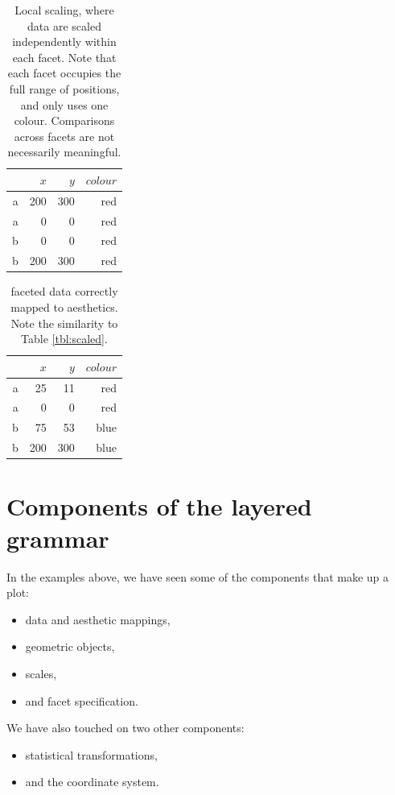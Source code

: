 \begin{table}[ht]
  \centering
  \begin{tabular}{r|r|r|r}
    & $x$ & $y$ & $colour$\\
    \hline
    a & 200 & 300 & red\\
    a & 0 & 0 & red\\
    \hline \hline
    b & 0 & 0 & red\\
    b & 200 & 300 & red
  \end{tabular}

  \caption{Local scaling, where data are scaled independently within each facet. Note that each facet occupies the full range of positions, and only uses one colour.  Comparisons across facets are not necessarily meaningful.}
  \label{tbl:complex-incorrect}
\end{table}

\begin{table}[ht]
  \centering
  \begin{tabular}{r|r|r|r}
    & $x$ & $y$ & $colour$\\
    \hline
    a & 25 & 11 & red\\
    a & 0 & 0 & red\\
    \hline \hline
    b & 75 & 53 & blue\\
    b & 200 & 300 & blue
  \end{tabular}

  \caption{faceted data correctly mapped to aesthetics.  Note the similarity to Table \ref{tbl:scaled}.}
  \label{tbl:complex-mapping}
\end{table}

\section{Components of the layered grammar}

In the examples above, we have seen some of the components that make up a plot:

\begin{itemize}
  \item data and aesthetic mappings,
  \item geometric objects, 
  \item scales,
  \item and facet specification.
\end{itemize}

\noindent We have also touched on two other components: 

\begin{itemize}
  \item statistical transformations,
  \item and the coordinate system.
\end{itemize}

